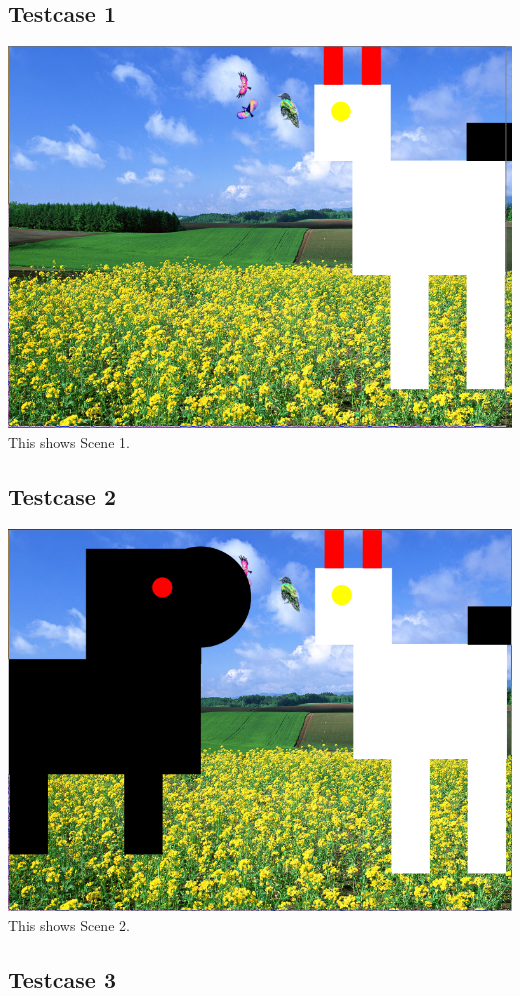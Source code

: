 \documentclass{article}
\begin{document}
\subsection{Testcase 1}
\includegraphics[scale=0.5]{Scene1.png}
\newline This shows Scene 1.
\newpage\subsection{Testcase 2}
\includegraphics[scale=0.5]{Scene2.png}
\newline This shows Scene 2.
\newpage\subsection{Testcase 3}
\end{document}
